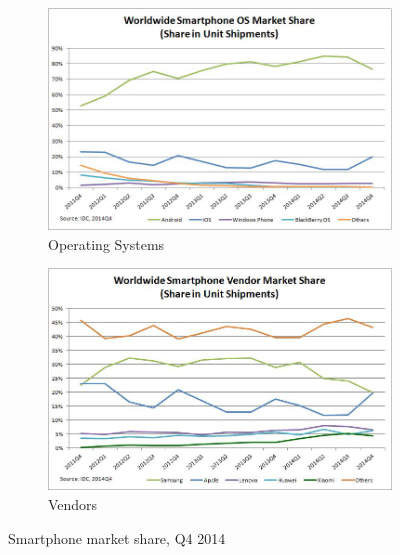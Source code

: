 \begin{figure}[h]
	\centering
	\begin{subfigure}{.49\textwidth}
  		\centering
  		\includegraphics[width=0.98\linewidth]{./images/smartphone-os-market-share.png}
  		\caption{Operating Systems}
  		\label{fig:OSMarketShare}
	\end{subfigure}
	\begin{subfigure}{.49\textwidth}
  		\centering
  		\includegraphics[width=0.98\linewidth]{./images/smartphone-vendor-market-share.png}
  		\caption{Vendors}
  		\label{fig:VendorMarketShare}
	\end{subfigure}
	\caption[Smartphone operating system's and vendor's market share, Q4 2014, retrieved from \cite{IDC:2015aa} and \cite{IDC:2015ab}]{Smartphone market share, Q4 2014}
	\label{fig:Shares}
\end{figure}
\nocite{IDC:2015aa, IDC:2015ab}

